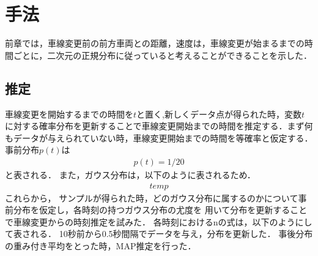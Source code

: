 \chapter{手法}
前章では，車線変更前の前方車両との距離，速度は，車線変更が始まるまでの時間ごとに，二次元の正規分布に従っていると考えることができることを示した．
\section{推定}
車線変更を開始するまでの時間を$t$と置く,新しくデータ点が得られた時，変数$t$に対する確率分布を更新することで車線変更開始までの時間を推定する．まず何もデータが与えられていない時，車線変更開始までの時間を等確率と仮定する．事前分布$p(t)$は
\begin{align}
p(t)=1/20
\end{align}
と表される．
また，ガウス分布は，以下のように表されるため．
\begin{align}
temp
\end{align}
これらから，
サンプルが得られた時，どのガウス分布に属するのかについて事前分布を仮定し，各時刻の持つガウス分布の尤度を
用いて分布を更新することで車線変更からの時刻推定を試みた．
各時刻におけるnの式は，以下のようにして表される．
10秒前から0.5秒間隔でデータを与え，分布を更新した．
事後分布の重み付き平均をとった時，MAP推定を行った．
